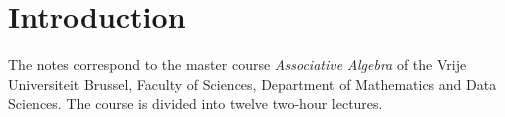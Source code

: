 
%






\thispagestyle{plain}
\section*{Introduction}

The notes correspond to the master  
course \emph{Associative Algebra} of the 
Vrije Universiteit Brussel, 
Faculty of Sciences, 
Department of Mathematics and Data Sciences. The course
is divided into twelve two-hour lectures. 

